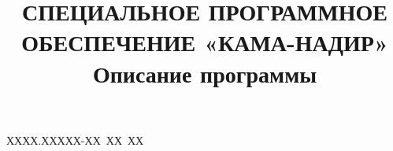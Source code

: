 \documentclass[a4paper,14pt]{article}
\title{\textbf{СПЕЦИАЛЬНОЕ ПРОГРАММНОЕ ОБЕСПЕЧЕНИЕ «КАМА-НАДИР»} \\Описание программы}
\begin{document}
\begin{uspd}{ХХХХ.ХХХХХ-ХХ~ХХ~ХХ}



\end{uspd}
\end{document}

